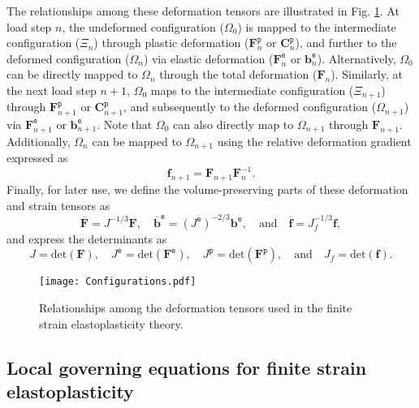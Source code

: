 \documentclass[preprint,11pt]{elsarticle}
\theoremstyle{definition}
\begin{document}
The relationships among these deformation tensors are illustrated in Fig. \ref{Fig: Configurations}. At load step $n$, the undeformed configuration ($\Omega_0$) is mapped to the intermediate configuration ($\Xi_n$) through plastic deformation ($\mathbf{F}_n^\texttt{p}$ or $\mathbf{C}_n^\texttt{p}$), and further to the deformed configuration ($\Omega_n$) via elastic deformation ($\mathbf{F}_n^\texttt{e}$ or $\mathbf{b}_n^\texttt{e}$). Alternatively, $\Omega_0$ can be directly mapped to $\Omega_n$ through the total deformation ($\mathbf{F}_n$). Similarly, at the next load step $n+1$, $\Omega_0$ maps to the intermediate configuration ($\Xi_{n+1}$) through $\mathbf{F}_{n+1}^\texttt{p}$ or $\mathbf{C}_{n+1}^\texttt{p}$, and subsequently to the deformed configuration ($\Omega_{n+1}$) via $\mathbf{F}_{n+1}^\texttt{e}$ or $\mathbf{b}_{n+1}^\texttt{e}$. Note that $\Omega_0$ can also directly map to $\Omega_{n+1}$ through $\mathbf{F}_{n+1}$. Additionally, $\Omega_n$ can be mapped to $\Omega_{n+1}$ using the relative deformation gradient expressed as
\begin{equation*}
    \mathbf{f}_{n+1} = \mathbf{F}_{n+1} \mathbf{F}_n^{-1}.
\end{equation*}
Finally, for later use, we define the volume-preserving parts of these deformation and strain tensors as
\begin{equation*}
    \overline{\mathbf{F}} = J^{-1/3} \mathbf{F}, \quad
    \overline{\mathbf{b}}^\texttt{e} = {(J^\texttt{e})}^{-2/3} \mathbf{b}^\texttt{e}, \quad \text{and} \quad
    \overline{\mathbf{f}} = J_f^{-1/3} \mathbf{f},
\end{equation*}
and express the determinants as
\begin{equation*}
    J = \text{det}(\mathbf{F}), \quad
    J^\texttt{e} = \text{det}(\mathbf{F}^\texttt{e}), \quad
    J^\texttt{p} = \text{det}(\mathbf{F}^\texttt{p}), \quad \text{and} \quad
    J_f = \text{det}(\mathbf{f}).
\end{equation*}

\begin{figure}[!htbp]
    \centering
    \texttt{[image: Configurations.pdf]}
    \caption{Relationships among the deformation tensors used in the finite strain elastoplasticity theory.}
    \label{Fig: Configurations}
\end{figure}

\subsection{Local governing equations for finite strain elastoplasticity}
\end{document}
